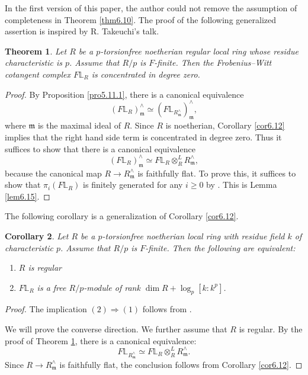 \documentclass[11pt, a4paper]{amsart}
\theoremstyle{plain}
\newtheorem{theorem}{Theorem}[section]
\newtheorem{coro}[theorem]{Corollary}
\theoremstyle{definition}
\begin{document}
In the first version of this paper, the author could not remove the assumption of completeness in Theorem \ref{thm6.10}. The proof of the following generalized assertion is inspired by R. Takeuchi's talk.
\begin{theorem}\label{thm6.16}
    Let $R$ be a $p$-torsionfree noetherian regular local ring whose residue characteristic is $p$. Assume that $R/p$ is $F$-finite. Then the Frobenius--Witt cotangent complex $F\mathbb L_R$ is concentrated in degree zero.
\end{theorem}
\begin{proof}
    By Proposition \ref{pro5.11.1}, there is a canonical equivalence
    \[(F\mathbb L_R)_{\mathfrak m}^{\wedge}\simeq (F\mathbb L_{R_{\mathfrak m}^{\wedge}})_{\mathfrak m}^{\wedge},\] where $\mathfrak m$ is the maximal ideal of $R$. Since $R$ is noetherian, Corollary \ref{cor6.12} implies that the right hand side term is concentrated in degree zero. Thus it suffices to show that there is a canonical equivalence\[(F\mathbb L_R)_{\mathfrak m}^{\wedge}\simeq F\mathbb L_R\otimes_R^LR_{\mathfrak m}^{\wedge},\] because the canonical map $R\to R_{\mathfrak m}^{\wedge}$ is faithfully flat. To prove this, it suffices to show that $\pi_i(F\mathbb L_R)$ is finitely generated for any $i\ge 0$ by \cite[Tag 0A06]{Sta26}. This is Lemma \ref{lem6.15}.
\end{proof}
The following corollary is a generalization of Corollary \ref{cor6.12}.
\begin{coro}\label{cor6.17}
    Let $R$ be a $p$-torsionfree noetherian local ring with residue field $k$ of characteristic $p$. Assume that $R/p$ is $F$-finite. Then the following are equivalent:\begin{enumerate}
        \item $R$ is regular
        \item $F\mathbb L_R$ is a free $R/p$-module of rank $\operatorname{dim}R+\operatorname{log}_p[k:k^p]$.
    \end{enumerate}
\end{coro}
\begin{proof}
    The implication $(2)\Rightarrow (1)$ follows from \cite[Theorem 4.5]{Tak26}.

    We will prove the converse direction. We further assume that $R$ is regular. By the proof of Theorem \ref{thm6.16}, there is a canonical equivalence:
    \[F\mathbb L_{R_{\mathfrak m}^{\wedge}}\simeq F\mathbb L_R\otimes_R^LR_{\mathfrak m}^{\wedge}.\]
    Since $R\to R_{\mathfrak m}^{\wedge}$ is faithfully flat, the conclusion follows from Corollary \ref{cor6.12}.
\end{proof}
\end{document}
